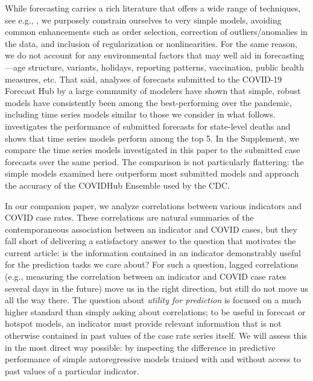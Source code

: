 \documentclass[9pt,twocolumn,twoside,lineno]{pnas-new}
\begin{document}
While forecasting carries a rich literature that offers a wide range of
techniques, see e.g., \cite{Hyndman:2018}, we purposely constrain ourselves to
very simple models, avoiding common enhancements such as order selection,
correction of outliers/anomalies in the data, and inclusion of regularization or
nonlinearities.
For the same reason, we do not account for any environmental factors that may
well aid in forecasting---age structure, variants, holidays,
reporting patterns, vaccination, public health measures, etc.
That said, analyses of forecasts submitted to the COVID-19
Forecast Hub \cite{ForecastHub} by a large community of modelers have shown that
simple, robust models have consistently been among the best-performing over the
pandemic, including time series models similar to those we
consider in what follows.
\cite{Cramer:2021} investigates the performance of submitted forecasts for
state-level deaths and shows that time series models perform among the top 5.
In the Supplement, we compare the time series models investigated in this paper
to the submitted case forecasts over the same period. The comparison is not
particularly flattering: the simple models examined here outperform most
submitted models and approach the accuracy of the COVIDHub Ensemble used by the
CDC. 


In our companion paper, we analyze correlations between various indicators and   
COVID case rates. These correlations are natural summaries of the
contemporaneous association between an indicator and COVID cases, but they fall 
short of delivering a satisfactory answer to the question that motivates the
current article: is the information contained in an indicator demonstrably
useful for the prediction tasks we care about? For such a question, lagged
correlations (e.g., measuring the correlation between an indicator and COVID
case rates several days in the future) move us in the right direction, but still
do not move us all the way there. The question about \textit{utility for 
  prediction} is focused on a much higher standard than simply asking 
about correlations; to be useful in forecast or hotspot models, an indicator
must provide relevant information that is not otherwise contained in past values
of the case rate series itself. We will assess this in the most direct way
possible: by inspecting the difference in predictive performance of simple
autoregressive models trained with and without access to past values of a
particular indicator.   
\end{document}
